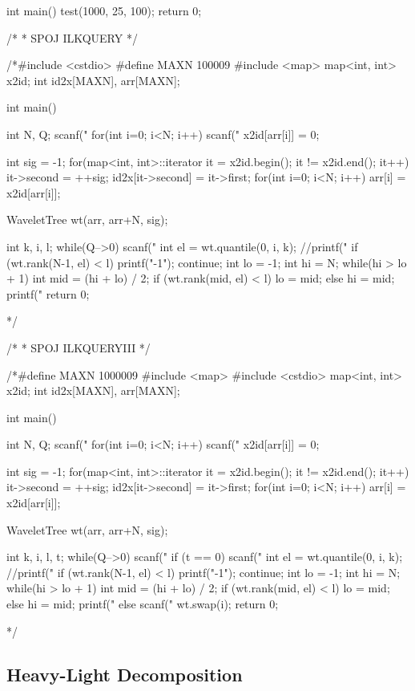 \documentclass[11pt]{article}
\begin{document}
\begin{vncode}
int main() {
	test(1000, 25, 100);
	return 0;
}

/*
 * SPOJ ILKQUERY
 */

/*#include <cstdio>
#define MAXN 100009
#include <map>
map<int, int> x2id;
int id2x[MAXN], arr[MAXN];

int main() {
	int N, Q;
	scanf("%
	for(int i=0; i<N; i++) {
		scanf("%
		x2id[arr[i]] = 0;
	}
	
	int sig = -1;
	for(map<int, int>::iterator it = x2id.begin(); it != x2id.end(); it++) {
		it->second = ++sig;
		id2x[it->second] = it->first;
	}
	for(int i=0; i<N; i++) arr[i] = x2id[arr[i]];
	
	WaveletTree wt(arr, arr+N, sig);
	
	int k, i, l;
	while(Q-->0) {
		scanf("%
		int el = wt.quantile(0, i, k);
		//printf("%
		if (wt.rank(N-1, el) < l) {
			printf("-1\n");
			continue;
		}
		int lo = -1;
		int hi = N;
		while(hi > lo + 1) {
			int mid = (hi + lo) / 2;
			if (wt.rank(mid, el) < l) lo = mid;
			else hi = mid;
		}
		printf("%
	}
	return 0;
}*/

/*
 * SPOJ ILKQUERYIII
 */

/*#define MAXN 1000009
#include <map>
#include <cstdio>
map<int, int> x2id;
int id2x[MAXN], arr[MAXN];

int main() {
	int N, Q;
	scanf("%
	for(int i=0; i<N; i++) {
		scanf("%
		x2id[arr[i]] = 0;
	}
	
	int sig = -1;
	for(map<int, int>::iterator it = x2id.begin(); it != x2id.end(); it++) {
		it->second = ++sig;
		id2x[it->second] = it->first;
	}
	for(int i=0; i<N; i++) arr[i] = x2id[arr[i]];
	
	WaveletTree wt(arr, arr+N, sig);
	
	int k, i, l, t;
	while(Q-->0) {
		scanf("%
		if (t == 0) {
			scanf("%
			int el = wt.quantile(0, i, k);
			//printf("%
			if (wt.rank(N-1, el) < l) {
				printf("-1\n");
				continue;
			}
			int lo = -1;
			int hi = N;
			while(hi > lo + 1) {
				int mid = (hi + lo) / 2;
				if (wt.rank(mid, el) < l) lo = mid;
				else hi = mid;
			}
			printf("%
		}
		else {
			scanf("%
			wt.swap(i);
		}
	}
	return 0;
}*/
\end{vncode}
\endgroup


\subsection{Heavy-Light Decomposition}
\end{document}
